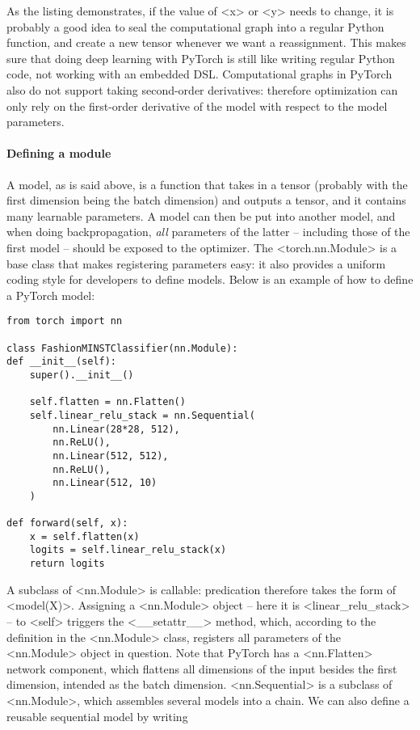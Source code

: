 \documentclass[hyperref, a4paper, 12pt]{report}
\def\texttt#1{<#1>}%
\newcommand{\shortcode}[1]{\texttt{#1}}
\begin{document}
As the listing demonstrates, if the value of \shortcode{x} or \shortcode{y} needs to change,
it is probably a good idea to seal the computational graph into a regular Python function,
and create a new tensor whenever we want a reassignment.
This makes sure that doing deep learning with PyTorch is still like writing regular Python code,
not working with an embedded DSL.
Computational graphs in PyTorch also do not support taking second-order derivatives:
therefore optimization can only rely on the first-order derivative of the model with respect to the model parameters.

\paragraph*{Defining a module}
A model, as is said above, is a function that takes in a tensor (probably with the first dimension being the batch dimension) and outputs a tensor,
and it contains many learnable parameters.
A model can then be put into another model,
and when doing backpropagation,
\emph{all} parameters of the latter -- including those of the first model -- 
should be exposed to the optimizer.
The \shortcode{torch.nn.Module} is a base class that makes registering parameters easy:
it also provides a uniform coding style for developers to define models.
Below is an example of how to define a PyTorch model:

\begin{lstlisting}
from torch import nn 

class FashionMINSTClassifier(nn.Module):
def __init__(self):
    super().__init__()
    
    self.flatten = nn.Flatten()
    self.linear_relu_stack = nn.Sequential(
        nn.Linear(28*28, 512),
        nn.ReLU(),
        nn.Linear(512, 512),
        nn.ReLU(),
        nn.Linear(512, 10)
    )
    
def forward(self, x):
    x = self.flatten(x)
    logits = self.linear_relu_stack(x)
    return logits
\end{lstlisting}

A subclass of \shortcode{nn.Module} is callable:
predication therefore takes the form of \shortcode{model(X)}.
Assigning a \shortcode{nn.Module} object -- here it is \shortcode{linear_relu_stack} -- to \shortcode{self} triggers the \shortcode{__setattr__} method,
which, according to the definition in the \shortcode{nn.Module} class,
registers all parameters of the \shortcode{nn.Module} object in question.
Note that PyTorch has a \shortcode{nn.Flatten} network component,
which flattens all dimensions of the input besides the first dimension,
intended as the batch dimension.
\shortcode{nn.Sequential} is a subclass of \shortcode{nn.Module},
which assembles several models into a chain.
We can also define a reusable sequential model by writing
\end{document}
